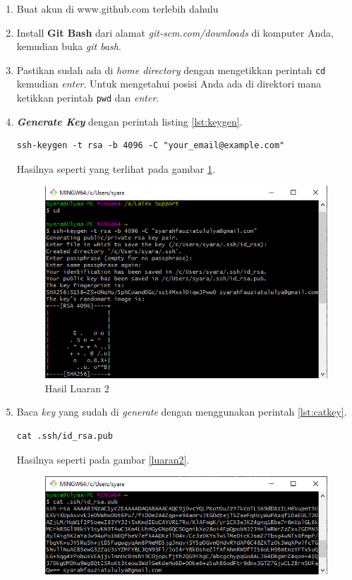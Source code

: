 \begin{enumerate}
\item Buat akun di www.github.com terlebih dahulu
\item Install \textbf{Git Bash} dari alamat \textit{git-scm.com/downloads} di komputer Anda, kemudian buka \textit{git bash}.
\item Pastikan sudah ada di \textit{home directory} dengan mengetikkan perintah \verb|cd| kemudian \textit{enter}. Untuk mengetahui posisi Anda ada di direktori mana ketikkan perintah \verb|pwd| dan \textit{enter}.
\item \textbf{\textit{Generate Key}} dengan perintah listing \ref{lst:keygen}.

\begin{lstlisting}[caption=Perintah Membuat Key,label={lst:keygen}]
ssh-keygen -t rsa -b 4096 -C "your_email@example.com"
\end{lstlisting}
Hasilnya seperti yang terlihat pada gambar \ref{luaran1}.
\begin{figure}[!htbp]
\centerline{\includegraphics[width=.75\textwidth]{Figures/langkah1.PNG}}
\caption{Hasil Luaran 2}
\label{luaran1}
\end{figure}
\item Baca \textit{key} yang sudah di \textit{generate} dengan menggunakan perintah \ref{lst:catkey}.
\begin{lstlisting}[caption=Perintah Membaca Public Key,breaklines,label={lst:catkey}]
cat .ssh/id_rsa.pub
\end{lstlisting}
Hasilnya seperti pada gambar \ref{luaran2}.
\begin{figure}[!htbp]
\centerline{\includegraphics[width=.75\textwidth]{Figures/langkah2.PNG}}

\end{figure}
\end{enumerate}

